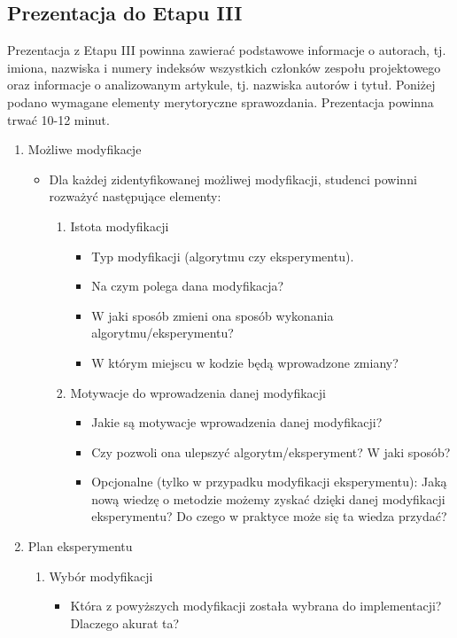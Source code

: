 \documentclass[a4paper]{LTJournalArticle}
\begin{document}
	\subsection{Prezentacja do Etapu III}
	Prezentacja z Etapu III powinna zawierać podstawowe informacje 
	o autorach, tj. imiona, nazwiska i numery indeksów wszystkich członków zespołu 
	projektowego oraz informacje o analizowanym artykule, tj. nazwiska autorów i 
	tytuł. 
	Poniżej podano wymagane elementy merytoryczne sprawozdania.
	Prezentacja powinna trwać 10-12 minut.
	\begin{enumerate}
		\item Możliwe modyfikacje
		\begin{itemize}
			\item Dla każdej zidentyfikowanej możliwej modyfikacji, studenci powinni rozważyć następujące elementy:
			\begin{enumerate}
				\item Istota modyfikacji
				\begin{itemize}
					\item Typ modyfikacji (algorytmu czy eksperymentu).
					\item Na czym polega dana modyfikacja?
					\item W jaki sposób zmieni ona sposób wykonania algorytmu/eksperymentu?
					\item W którym miejscu w kodzie będą wprowadzone zmiany?
				\end{itemize}
				\item Motywacje do wprowadzenia danej modyfikacji
				\begin{itemize}
					\item Jakie są motywacje wprowadzenia danej modyfikacji?
					\item Czy pozwoli ona ulepszyć algorytm/eksperyment? W jaki sposób?
					\item Opcjonalne (tylko w przypadku modyfikacji eksperymentu): Jaką nową wiedzę o metodzie możemy zyskać dzięki danej modyfikacji eksperymentu? Do czego w praktyce może się ta wiedza przydać?
				\end{itemize}
			\end{enumerate}
		\end{itemize}
		\item Plan eksperymentu
		\begin{enumerate}
			\item Wybór modyfikacji
			\begin{itemize}
				\item Która z powyższych modyfikacji została wybrana do implementacji? Dlaczego akurat ta?

\end{itemize}
\end{enumerate}
\end{enumerate}
\end{document}
